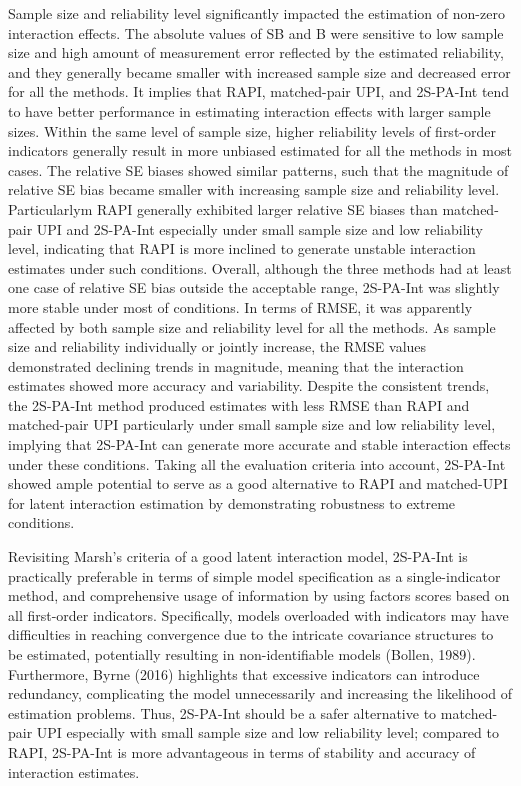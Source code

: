 \documentclass[
  man]{apa6}
\begin{document}
Sample size and reliability level significantly impacted the estimation of non-zero interaction effects. The absolute values of SB and B were sensitive to low sample size and high amount of measurement error reflected by the estimated reliability, and they generally became smaller with increased sample size and decreased error for all the methods. It implies that RAPI, matched-pair UPI, and 2S-PA-Int tend to have better performance in estimating interaction effects with larger sample sizes. Within the same level of sample size, higher reliability levels of first-order indicators generally result in more unbiased estimated for all the methods in most cases. The relative SE biases showed similar patterns, such that the magnitude of relative SE bias became smaller with increasing sample size and reliability level. Particularlym RAPI generally exhibited larger relative SE biases than matched-pair UPI and 2S-PA-Int especially under small sample size and low reliability level, indicating that RAPI is more inclined to generate unstable interaction estimates under such conditions. Overall, although the three methods had at least one case of relative SE bias outside the acceptable range, 2S-PA-Int was slightly more stable under most of conditions. In terms of RMSE, it was apparently affected by both sample size and reliability level for all the methods. As sample size and reliability individually or jointly increase, the RMSE values demonstrated declining trends in magnitude, meaning that the interaction estimates showed more accuracy and variability. Despite the consistent trends, the 2S-PA-Int method produced estimates with less RMSE than RAPI and matched-pair UPI particularly under small sample size and low reliability level, implying that 2S-PA-Int can generate more accurate and stable interaction effects under these conditions. Taking all the evaluation criteria into account, 2S-PA-Int showed ample potential to serve as a good alternative to RAPI and matched-UPI for latent interaction estimation by demonstrating robustness to extreme conditions.

Revisiting Marsh's criteria of a good latent interaction model, 2S-PA-Int is practically preferable in terms of simple model specification as a single-indicator method, and comprehensive usage of information by using factors scores based on all first-order indicators. Specifically, models overloaded with indicators may have difficulties in reaching convergence due to the intricate covariance structures to be estimated, potentially resulting in non-identifiable models (Bollen, 1989). Furthermore, Byrne (2016) highlights that excessive indicators can introduce redundancy, complicating the model unnecessarily and increasing the likelihood of estimation problems. Thus, 2S-PA-Int should be a safer alternative to matched-pair UPI especially with small sample size and low reliability level; compared to RAPI, 2S-PA-Int is more advantageous in terms of stability and accuracy of interaction estimates.
\end{document}
